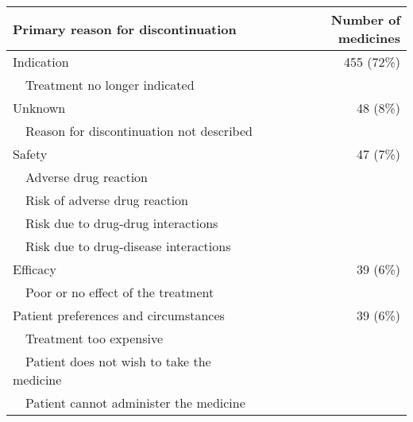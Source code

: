 \begin{table}[]
\begin{tabular}{lr@{}}
\toprule
\textbf{Primary reason for discontinuation} & \textbf{Number of medicines} \\ \midrule
Indication                                  & 455 (72\%)                                       \\
~~Treatment no longer indicated               &                                                  \\
Unknown                                     & 48 (8\%)                                         \\
~~Reason for discontinuation not described    &                                                  \\
Safety                                      & 47 (7\%)                                         \\
~~Adverse drug reaction                       &                                                  \\
~~Risk of adverse drug reaction               &                                                  \\
~~Risk due to drug-drug interactions          &                                                  \\
~~Risk due to drug-disease interactions       &                                                  \\
Efficacy                                    & 39 (6\%)                                         \\
~~Poor or no effect of the treatment          &                                                  \\
Patient preferences and circumstances       & 39 (6\%)                                         \\
~~Treatment too expensive                     &                                                  \\
~~Patient does not wish to take the medicine  &                                                  \\
~~Patient cannot administer the medicine      &                                                  \\ \bottomrule
\end{tabular}
\end{table}